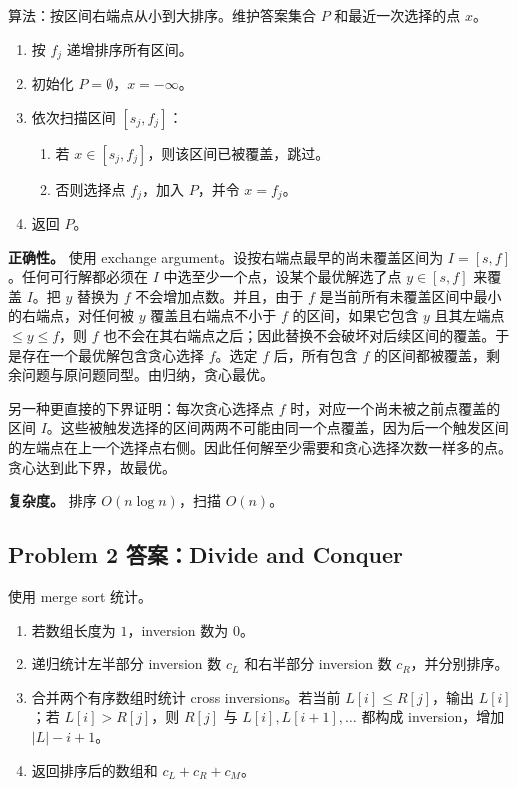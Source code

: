 \documentclass[UTF8,a4paper,11pt]{ctexart}
\begin{document}
算法：按区间右端点从小到大排序。维护答案集合 $P$ 和最近一次选择的点 $x$。
\begin{enumerate}
  \item 按 $f_j$ 递增排序所有区间。
  \item 初始化 $P=\emptyset$，$x=-\infty$。
  \item 依次扫描区间 $[s_j,f_j]$：
  \begin{enumerate}
    \item 若 $x\in[s_j,f_j]$，则该区间已被覆盖，跳过。
    \item 否则选择点 $f_j$，加入 $P$，并令 $x=f_j$。
  \end{enumerate}
  \item 返回 $P$。
\end{enumerate}

\textbf{正确性。} 使用 exchange argument。设按右端点最早的尚未覆盖区间为 $I=[s,f]$。任何可行解都必须在 $I$ 中选至少一个点，设某个最优解选了点 $y\in[s,f]$ 来覆盖 $I$。把 $y$ 替换为 $f$ 不会增加点数。并且，由于 $f$ 是当前所有未覆盖区间中最小的右端点，对任何被 $y$ 覆盖且右端点不小于 $f$ 的区间，如果它包含 $y$ 且其左端点 $\le y\le f$，则 $f$ 也不会在其右端点之后；因此替换不会破坏对后续区间的覆盖。于是存在一个最优解包含贪心选择 $f$。选定 $f$ 后，所有包含 $f$ 的区间都被覆盖，剩余问题与原问题同型。由归纳，贪心最优。

另一种更直接的下界证明：每次贪心选择点 $f$ 时，对应一个尚未被之前点覆盖的区间 $I$。这些被触发选择的区间两两不可能由同一个点覆盖，因为后一个触发区间的左端点在上一个选择点右侧。因此任何解至少需要和贪心选择次数一样多的点。贪心达到此下界，故最优。

\textbf{复杂度。} 排序 $O(n\log n)$，扫描 $O(n)$。

\subsection*{Problem 2 答案：Divide and Conquer}

使用 merge sort 统计。
\begin{enumerate}
  \item 若数组长度为 $1$，inversion 数为 $0$。
  \item 递归统计左半部分 inversion 数 $c_L$ 和右半部分 inversion 数 $c_R$，并分别排序。
  \item 合并两个有序数组时统计 cross inversions。若当前 $L[i]\le R[j]$，输出 $L[i]$；若 $L[i]>R[j]$，则 $R[j]$ 与 $L[i],L[i+1],\ldots$ 都构成 inversion，增加 $|L|-i+1$。
  \item 返回排序后的数组和 $c_L+c_R+c_M$。
\end{enumerate}
\end{document}
